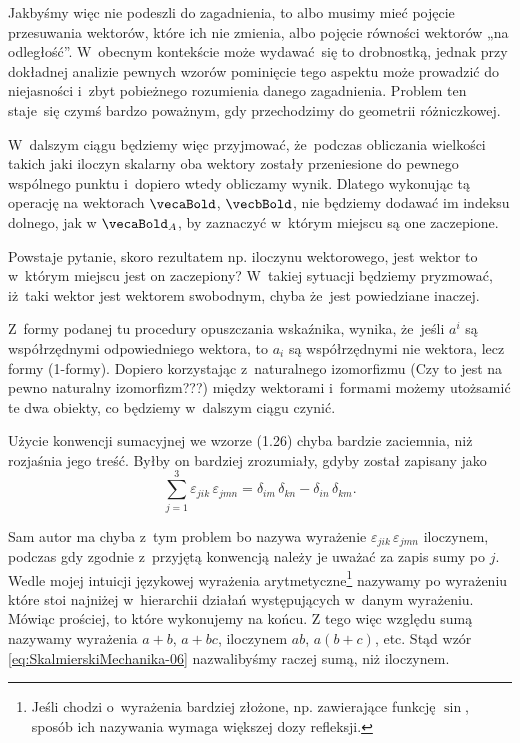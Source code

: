 \documentclass[a4paper,11pt]{article}
\numberwithin{equation}{section}
\begin{document}
Jakbyśmy więc nie podeszli do zagadnienia, to albo musimy mieć pojęcie
przesuwania wektorów, które ich nie zmienia, albo pojęcie równości wektorów
„na odległość”. W~obecnym kontekście może wydawać~się to drobnostką, jednak
przy dokładnej analizie pewnych wzorów pominięcie tego aspektu może
prowadzić do niejasności i~zbyt pobieżnego rozumienia danego zagadnienia.
Problem ten staje~się czymś bardzo poważnym, gdy przechodzimy do geometrii
różniczkowej.

W~dalszym ciągu będziemy więc przyjmować, że~podczas obliczania wielkości
takich jaki iloczyn skalarny oba wektory zostały przeniesione do pewnego
wspólnego punktu i~dopiero wtedy obliczamy wynik. Dlatego wykonując tą
operację na wektorach $\vecaBold$, $\vecbBold$, nie będziemy dodawać im
indeksu dolnego, jak w $\vecaBold_{ A }$, by zaznaczyć w~którym miejscu są
one zaczepione.

Powstaje pytanie, skoro rezultatem np. iloczynu wektorowego, jest wektor to
w~którym miejscu jest on zaczepiony? W~takiej sytuacji będziemy pryzmować,
iż~taki wektor jest wektorem swobodnym, chyba że~jest powiedziane inaczej.

\VerSpaceFour





\noindent
{} Z~formy podanej tu procedury opuszczania wskaźnika, wynika,
że~jeśli $a^{ i }$ są współrzędnymi odpowiedniego wektora, to $a_{ i }$ są
współrzędnymi nie wektora, lecz formy (1-formy). Dopiero korzystając
z~naturalnego izomorfizmu (Czy to jest na pewno naturalny izomorfizm???)
między wektorami i~formami możemy utożsamić te dwa obiekty, co będziemy
w~dalszym ciągu czynić.

\VerSpaceFour





\noindent
{} Użycie konwencji sumacyjnej we wzorze (1.26) chyba bardzie
zaciemnia, niż rozjaśnia jego treść. Byłby on bardziej zrozumiały, gdyby
został zapisany jako
\begin{equation}
  \label{eq:SkalmierskiMechanika-06}
  \sum_{ j = 1 }^{ 3 } \varepsilon_{ j i k } \, \varepsilon_{ j m n }
  = \delta_{ i m } \, \delta_{ k n } - \delta_{ i n } \, \delta_{ k m }.
\end{equation}

Sam autor ma chyba z~tym problem bo nazywa wyrażenie
$\varepsilon_{ j i k } \, \varepsilon_{ j m n }$ iloczynem, podczas gdy zgodnie z~przyjętą
konwencją należy je uważać za zapis sumy po $j$. Wedle mojej intuicji
językowej wyrażenia arytmetyczne\footnote{Jeśli chodzi o~wyrażenia bardziej
  złożone, np. zawierające funkcję $\sin$, sposób ich nazywania wymaga
  większej dozy refleksji.} nazywamy po wyrażeniu które stoi najniżej
w~hierarchii działań występujących w~danym wyrażeniu. Mówiąc prościej,
to które wykonujemy na końcu. Z tego więc względu sumą nazywamy wyrażenia
$a + b$, $a + bc$, iloczynem $ab$, $a ( b + c )$, etc. Stąd wzór
\eqref{eq:SkalmierskiMechanika-06} nazwalibyśmy raczej sumą, niż iloczynem.
\end{document}
